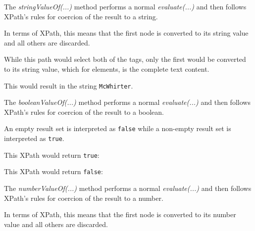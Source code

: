 \documentclass[20pt,landscape,headrule,footrule]{foils}
\begin{document}


The \emph{stringValueOf(...)} method performs a normal
\emph{evaluate(...)} and then follows XPath's rules for 
coercion of the result to a string.

In terms of XPath, this means that the first node is converted to
its string value and all others are discarded.


While this path would select both of the  tags,
only the first would be converted to its string value, which for
elements, is the complete text content. 

This would result in the string \texttt{McWhirter}.




The \emph{booleanValueOf(...)} method performs a normal
\emph{evaluate(...)} and then follows XPath's rules for
coercion of the result to a boolean.

An empty result set is interpreted as \texttt{false} while a
non-empty result set is interpreted as \texttt{true}.

This XPath would return \texttt{true}:


This XPath would return \texttt{false}:





The \emph{numberValueOf(...)} method performs a normal
\emph{evaluate(...)} and then follows XPath's rules for 
coercion of the result to a number.

In terms of XPath, this means that the first node is converted to
its number value and all others are discarded.
\end{document}
